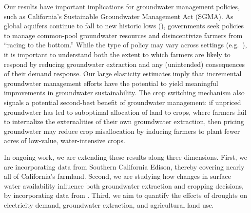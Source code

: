 Our results have important implications for groundwater management policies, such as California's Sustainable Groundwater Management Act (SGMA). As global aquifers continue to fall to new historic lows (\textcite{famiglietti2014}), governments seek policies to manage common-pool groundwater resources and disincentivize farmers from ``racing to the bottom.'' While the type of policy may vary across settings (e.g.\ \textcite{ryan2020}), it is important to understand both the extent to which farmers are likely to respond by reducing groundwater extraction and any (unintended) consequences of their demand response. Our large elasticity estimates imply that incremental groundwater management efforts have the potential to yield meaningful improvements in groundwater sustainability. The crop switching mechanism also signals a potential second-best benefit of groundwater management: if unpriced groundwater has led to suboptimal allocation of land to crops, where farmers fail to internalize the externalities of their own groundwater extraction, then pricing groundwater may reduce crop misallocation by inducing farmers to plant fewer acres of low-value, water-intensive crops.

In ongoing work, we are extending these results along three dimensions. First, we are incorporating data from Southern California Edison, thereby covering nearly all of California's farmland. Second, we are studying how changes in surface water availability influence both groundwater extraction and cropping decisions, by incorporating data from \textcite{hagerty2019}. Third, we aim to quantify the effects of droughts on electricity demand, groundwater extraction, and agricultural land use.



